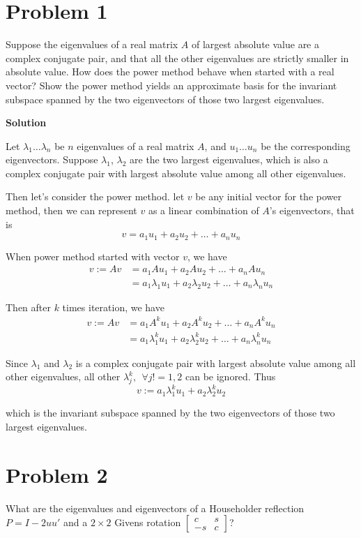 \documentclass[12pt,oneside,a4paper]{article}
\newcommand{\problem}[1]
{
    \clearpage
    \section*{Problem {#1}}
}
\newcommand{\solution}
{
    \vspace{15pt}
    \noindent\ignorespaces\textbf{\large Solution}\par
}
\begin{document}
\problem{1}
Suppose the eigenvalues of a real matrix $A$ of largest absolute value are a complex conjugate pair, and that all the other eigenvalues are strictly smaller in absolute value. How does the power method behave when started with a real vector? Show the power method yields an approximate basis for the invariant subspace spanned by the two eigenvectors of those two largest eigenvalues.

\solution
Let $\lambda_{1} \dots \lambda_{n}$ be $n$ eigenvalues of a real matrix $A$, and $u_{1} \dots u_{n}$ be the corresponding eigenvectors. Suppose $\lambda_{1}$, $\lambda_{2}$ are the two largest eigenvalues, which is also a complex conjugate pair with largest absolute value among all other eigenvalues. 

Then let's consider the power method. let $v$ be any initial vector for the power method, then we can represent $v$ as a linear combination of $A$'s eigenvectors, that is 
$$v = a_{1}u_{1} + a_{2}u_{2} + \dots + a_{n}u_{n}$$

When power method started with vector $v$, we have 
$$\begin{aligned}
v := Av &= a_{1}Au_{1} + a_{2}Au_{2} + \dots + a_{n}Au_{n}\\
&= a_{1}\lambda_{1}u_{1} + a_{2}\lambda_{2}u_{2} + \dots + a_{n}\lambda_{n}u_{n}
\end{aligned}$$

Then after $k$ times iteration, we have
$$\begin{aligned}
v := Av &= a_{1}A^{k}u_{1} + a_{2}A^{k}u_{2} + \dots + a_{n}A^{k}u_{n}\\
&= a_{1}\lambda_{1}^{k}u_{1} + a_{2}\lambda_{2}^{k}u_{2} + \dots + a_{n}\lambda_{n}^{k}u_{n}
\end{aligned}$$

Since $\lambda_{1}$ and $\lambda_{2}$ is a complex conjugate pair with largest absolute value among all other eigenvalues, all other $\lambda_{j}^{k},~~\forall j!=1,2$ can be ignored. Thus 
$$v:= a_{1}\lambda_{1}^{k}u_{1} + a_{2}\lambda_{2}^{k}u_{2}$$

which is the invariant subspace spanned by the two eigenvectors of those two largest eigenvalues.

\problem{2}
What are the eigenvalues and eigenvectors of a Householder reflection $P = I-2uu'$ and a $2 \times 2$ Givens rotation 
$\begin{bmatrix}
c&s\\
-s&c
\end{bmatrix}$?
\end{document}
